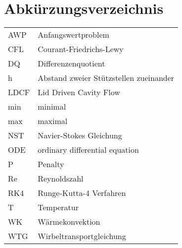 \chapter*{Abkürzungsverzeichnis}

\begingroup

    \setlength{\tabcolsep}{20pt}        %
    \renewcommand{\arraystretch}{1.3}   %
    
    \begin{longtable*}[l]{l l}
        
        AWP&Anfangswertproblem \\
        CFL&Courant-Friedrichs-Lewy\\
        DQ&Differenzenquotient\\
        h& Abstand zweier Stützstellen zueinander\\
        LDCF&Lid Driven Cavity Flow\\
        min&minimal\\
        max& maximal \\
        NST&Navier-Stokes Gleichung\\
        ODE & ordinary differential equation\\
        P&Penalty\\
        Re&Reynoldszahl\\
        RK4&Runge-Kutta-4 Verfahren\\
        T&Temperatur\\
        WK&Wärmekonvektion\\
        WTG&Wirbeltransportgleichung\\
    
    \end{longtable*}
\endgroup